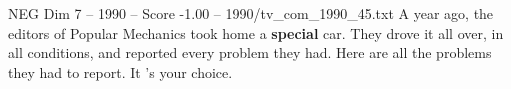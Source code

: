 \begin{textsample}{NEG Dim 7 – 1990 – Score -1.00 – 1990/tv\_com\_1990\_45.txt}  \label{ex:f7_neg_033}
A year ago, the editors of Popular Mechanics took home a \textbf{special} car.
They drove it all over, in all conditions, and reported every problem they had.
Here are all the problems they had to report.
It 's your choice.

\end{textsample}
